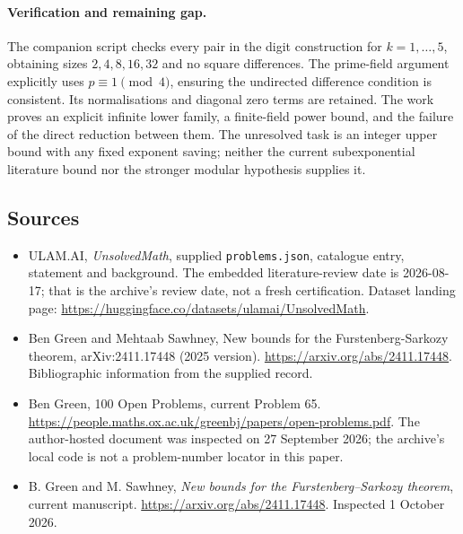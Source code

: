 \documentclass[11pt,a4paper]{article}
\begin{document}
\paragraph{Verification and remaining gap.}
The companion script checks every pair in the digit construction for $k=1,\ldots,5$, obtaining sizes $2,4,8,16,32$ and no square differences. The prime-field argument explicitly uses $p\equiv1\pmod4$, ensuring the undirected difference condition is consistent. Its normalisations and diagonal zero terms are retained. The work proves an explicit infinite lower family, a finite-field power bound, and the failure of the direct reduction between them. The unresolved task is an integer upper bound with any fixed exponent saving; neither the current subexponential literature bound nor the stronger modular hypothesis supplies it.

\subsection{Sources}

{\small

\begin{itemize}

\item[\hypertarget{source:statement:1}{S1}] ULAM.AI, \emph{UnsolvedMath}, supplied \texttt{problems.json}, catalogue entry, statement and background. The embedded literature-review date is 2026-08-17; that is the archive’s review date, not a fresh certification. Dataset landing page: \url{https://huggingface.co/datasets/ulamai/UnsolvedMath}.

\item[\hypertarget{source:statement:2}{S2}] Ben Green and Mehtaab Sawhney, New bounds for the Furstenberg-Sarkozy theorem, arXiv:2411.17448 (2025 version). \url{https://arxiv.org/abs/2411.17448}. Bibliographic information from the supplied record.

\item[\hypertarget{source:statement:3}{S3}] Ben Green, 100 Open Problems, current Problem 65. \url{https://people.maths.ox.ac.uk/greenbj/papers/open-problems.pdf}. The author-hosted document was inspected on 27 September 2026; the archive’s local code is not a problem-number locator in this paper.

\item[E1] B. Green and M. Sawhney, \emph{New bounds for the Furstenberg--Sarkozy theorem}, current manuscript. \url{https://arxiv.org/abs/2411.17448}. Inspected 1 October 2026.

\end{itemize}

}

\label{end:statement}
\end{document}
